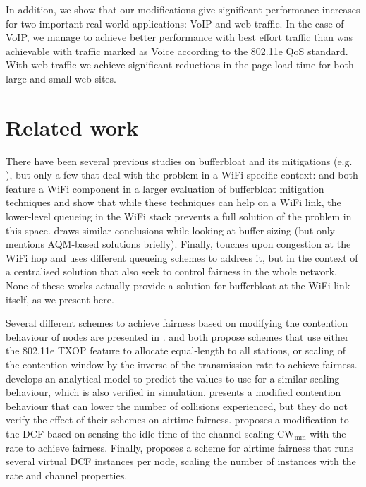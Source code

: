 \documentclass[english]{scrartcl}
\begin{document}
In addition, we show that our modifications give significant performance
increases for two important real-world applications: VoIP and web traffic. In
the case of VoIP, we manage to achieve better performance with best effort
traffic than was achievable with traffic marked as Voice according to the
802.11e QoS standard. With web traffic we achieve significant reductions in
the page load time for both large and small web sites.
\section{Related work}
\label{sec:related-work}
There have been several previous studies on bufferbloat and its mitigations
(e.g. \cite{cablelabs,much-ado}), but only a few that deal with the problem in a
WiFi-specific context: \cite{good-bad-wifi} and \cite{much-ado} both feature a
WiFi component in a larger evaluation of bufferbloat mitigation techniques and
show that while these techniques can help on a WiFi link, the lower-level
queueing in the WiFi stack prevents a full solution of the problem in this
space. \cite{showail_buffer_2016} draws similar conclusions while looking at
buffer sizing (but only mentions AQM-based solutions briefly). Finally,
\cite{cai_wireless_2007} touches upon congestion at the WiFi hop and uses
different queueing schemes to address it, but in the context of a centralised
solution that also seek to control fairness in the whole network. None of these
works actually provide a solution for bufferbloat at the WiFi link itself, as we
present here.

Several different schemes to achieve fairness based on modifying the contention
behaviour of nodes are presented in
\cite{jiang_proportional_2005,lin_achieving_2011,sanabria-russo_future_2013,joshi_airtime_2008,heusse_idle_2005,yazici_running_2013}.
\cite{jiang_proportional_2005} and \cite{lin_achieving_2011} both propose
schemes that use either the 802.11e TXOP feature to allocate equal-length to all
stations, or scaling of the contention window by the inverse of the transmission
rate to achieve fairness. \cite{joshi_airtime_2008} develops an analytical model
to predict the values to use for a similar scaling behaviour, which is also
verified in simulation. \cite{sanabria-russo_future_2013} presents a modified
contention behaviour that can lower the number of collisions experienced, but
they do not verify the effect of their schemes on airtime fairness.
\cite{heusse_idle_2005} proposes a modification to the DCF based on sensing the
idle time of the channel scaling CW\(_{\text{min}}\) with the rate to achieve fairness.
Finally, \cite{yazici_running_2013} proposes a scheme for airtime fairness that
runs several virtual DCF instances per node, scaling the number of instances
with the rate and channel properties.
\end{document}
